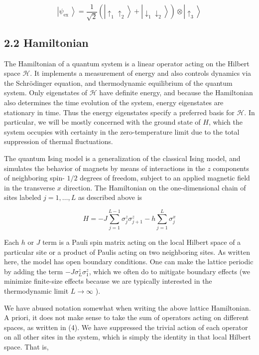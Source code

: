 \documentclass[10pt]{article}
\begin{document}
\begin{equation*}
\left|\psi_{\text {ex }}\right\rangle=\frac{1}{\sqrt{2}}\left(\left|\uparrow_{1} \uparrow_{2}\right\rangle+\left|\downarrow_{1} \downarrow_{2}\right\rangle\right) \otimes\left|\uparrow_{3}\right\rangle \tag{3}
\end{equation*}


\subsection*{2.2 Hamiltonian}
The Hamiltonian of a quantum system is a linear operator acting on the Hilbert space $\mathcal{H}$. It implements a measurement of energy and also controls dynamics via the Schrödinger equation, and thermodynamic equilibrium of the quantum system. Only eigenstates of $\mathcal{H}$ have definite energy, and because the Hamiltonian also determines the time evolution of the system, energy eigenstates are stationary in time. Thus the energy eigenstates specify a preferred basis for $\mathcal{H}$. In particular, we will be mostly concerned with the ground state of $H$, which the system occupies with certainty in the zero-temperature limit due to the total suppression of thermal fluctuations.

The quantum Ising model is a generalization of the classical Ising model, and simulates the behavior of magnets by means of interactions in the $z$ components of neighboring spin- $1 / 2$ degrees of freedom, subject to an applied magnetic field in the transverse $x$ direction. The Hamiltonian on the one-dimensional chain of sites labeled $j=1, \ldots, L$ as described above is


\begin{equation*}
H=-J \sum_{j=1}^{L-1} \sigma_{j}^{z} \sigma_{j+1}^{z}-h \sum_{j=1}^{L} \sigma_{j}^{x} \tag{4}
\end{equation*}


Each $h$ or $J$ term is a Pauli spin matrix acting on the local Hilbert space of a particular site or a product of Paulis acting on two neighboring sites. As written here, the model has open boundary conditions. One can make the lattice periodic by adding the term $-J \sigma_{L}^{z} \sigma_{1}^{z}$, which we often do to mitigate boundary effects (we minimize finite-size effects because we are typically interested in the thermodynamic limit $L \rightarrow \infty$ ).

We have abused notation somewhat when writing the above lattice Hamiltonian. A priori, it does not make sense to take the sum of operators acting on different spaces, as written in (4). We have suppressed the trivial action of each operator on all other sites in the system, which is simply the identity in that local Hilbert space. That is,
\end{document}
